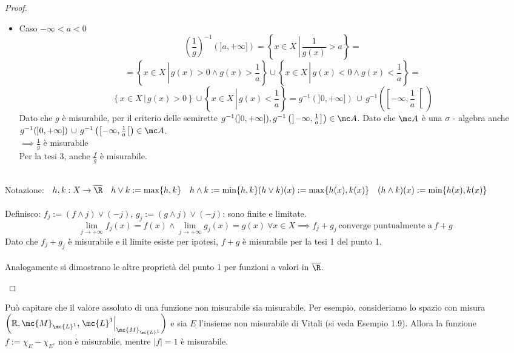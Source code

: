 \begin{proof}
\begin{enumerate}
\begin{itemize}
            \item Caso $- \infty <a<0$
            \[\left( \frac{1}{g}\right)^{-1} (]a,+ \infty]) = \left\{ x \in X \,\left|\, \frac{1}{g(x)} > a\right.\right\} = \]
            \[ = \left\{ x \in X \, \left| \, g(x) > 0 \land g(x) > \frac{1}{a}\right.\right\} \cup \left\{ x \in X \, \left| \, g(x) < 0 \land g(x) < \frac{1}{a}\right.\right\} = \]
            \[\left\{ x \in X \, \left| \, g(x) > 0 \right.\right\} \cup \left\{ x \in X \, \left| \, g(x) < \frac{1}{a}\right.\right\} = g^{-1}(]0,+ \infty]) \, \cup \, g^{-1} \left( \left[- \infty, \frac{1}{a} \right[\right) \]
            Dato che $g$ è misurabile, per il criterio delle semirette $g^{-1}(]0,+ \infty]), g^{-1} \left( \left]- \infty, \frac{1}{a} \right] \right) \in \mc A$. Dato che $\mc A$ è una $\sigma$ - algebra anche $g^{-1}(]0,+ \infty]) \, \cup \, g^{-1} \left( \left[- \infty, \frac{1}{a} \right[ \right) \in \mc A$. \\
            $\implies \frac{1}{g}$ è misurabile \\
            Per la tesi 3, anche $\frac{f}{g}$ è misurabile.
        \end{itemize}
        
         \\
        Notazione: \ $h,k: X \to \overline{\R} \ \ \ h \lor k := \max\{h,k\} \ \ \ h \land k := \min\{h,k\} \\ (h \lor k)(x) := \max\{h(x),k(x)\} \ \ \ (h \land k)(x) := \min\{h(x),k(x)\}  $  \\ \\
        Definisco: $f_j := (f \land j) \lor (-j)$, $g_j := (g \land j) \lor (-j)$: sono finite e limitate.
        \[\lim_{j \to + \infty} f_j(x) = f(x) \land \lim_{j \to + \infty} g_j(x) = g(x) \ \forall x \in X \implies f_j+g_j \ \text{converge puntualmente a} \ f+g\] 
        Dato che $f_j+g_j$ è misurabile e il limite esiste  per ipotesi, $f+g$ è misurabile per la tesi 1 del punto 1. \\ \\
        Analogamente si dimostrano le altre proprietà del punto 1 per funzioni a valori in $\overline{\R}$.\qedhere
    \end{enumerate}
\end{proof}

\begin{oss}Può capitare che il valore assoluto di una funzione non misurabile sia misurabile. Per esempio, consideriamo lo spazio con misura $\left(\mathbb{R}, \mc{M}_{\mc{L}^{1}},\left.\mc{L}^{1}\right|_{\mc{M}_{\mc{L}^{1}}}\right)$ e sia $E$ l'insieme non misurabile di Vitali (si veda Esempio 1.9). Allora la funzione $f:=\chi_{E}-\chi_{E^{c}}$ non è misurabile, mentre $|f|=1$ è misurabile.
\end{oss}

